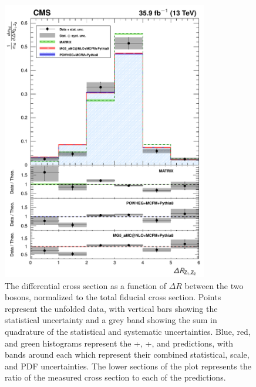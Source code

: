 \begin{figure}[htbp]
  \begin{center}
    \includegraphics[width=0.8\textwidth]{results/unfold_deltaRZZ.pdf}
    \caption[Normalized differential {\ZZ} cross section as a function of $\Delta R$ between the {\PZ} bosons]{
        The {\ZZ} differential cross section as a function of $\Delta R$ between the two {\PZ} bosons, normalized to the total fiducial cross section.
        Points represent the unfolded data, with vertical bars showing the statistical uncertainty and a grey band showing the sum in quadrature of the statistical and systematic uncertainties.
        Blue, red, and green histograms represent the {\POWHEG}+{\MCFM}, {\MGAMC}+{\MCFM}, and {\MATRIX} predictions, with bands around each which represent their combined statistical, scale, and PDF uncertainties.
        The lower sections of the plot represents the ratio of the measured cross section to each of the predictions.
      }\label{fig:unfold_deltaRZZ}
  \end{center}
\end{figure}

